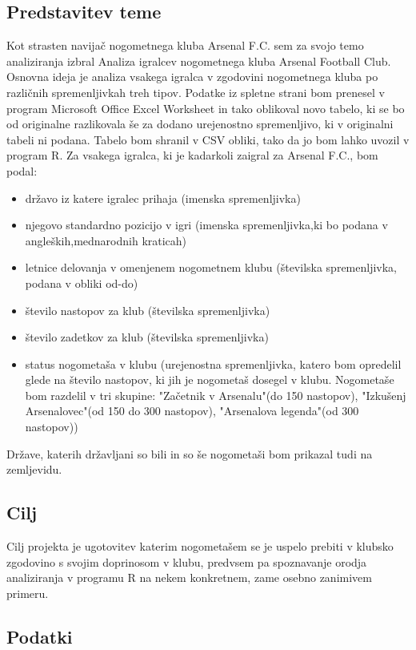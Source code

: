\documentclass[11pt,a4paper]{article}
\begin{document}
\subsection{Predstavitev teme}
Kot strasten navijač nogometnega kluba Arsenal F.C. sem za svojo temo analiziranja izbral Analiza igralcev nogometnega kluba Arsenal Football Club. Osnovna ideja je analiza vsakega igralca v zgodovini nogometnega kluba po različnih spremenljivkah treh tipov. Podatke iz spletne strani bom prenesel v program  Microsoft Office Excel Worksheet in tako oblikoval novo tabelo, ki se bo od originalne razlikovala še za dodano urejenostno spremenljivo, ki v originalni tabeli ni podana. Tabelo bom shranil v CSV obliki, tako da jo bom lahko uvozil v program  R. Za vsakega igralca, ki je kadarkoli zaigral za Arsenal F.C., bom podal: 
\begin{itemize}
\item{državo iz katere igralec prihaja (imenska spremenljivka)}
\item{njegovo standardno pozicijo v igri (imenska spremenljivka,ki bo podana v angleških,mednarodnih kraticah)}
\item{letnice delovanja v omenjenem nogometnem klubu (številska spremenljivka, podana v obliki od-do)}
\item{število nastopov za klub (številska spremenljivka)}
\item{število zadetkov za klub (številska spremenljivka)}
\item{status nogometaša v klubu (urejenostna spremenljivka, katero bom opredelil glede na število nastopov, ki jih je nogometaš dosegel v klubu. Nogometaše bom razdelil v tri skupine: "Začetnik v Arsenalu"(do 150 nastopov), "Izkušenj Arsenalovec"(od 150 do 300 nastopov), "Arsenalova legenda"(od 300 nastopov))}
\end{itemize}

Države, katerih državljani so bili in so še nogometaši bom prikazal tudi na zemljevidu.

\subsection{Cilj}

Cilj projekta je ugotovitev katerim nogometašem se je uspelo prebiti v klubsko zgodovino s svojim doprinosom v klubu, predvsem pa spoznavanje orodja analiziranja v programu R na nekem konkretnem, zame osebno zanimivem primeru. 

\subsection{Podatki}
\end{document}
